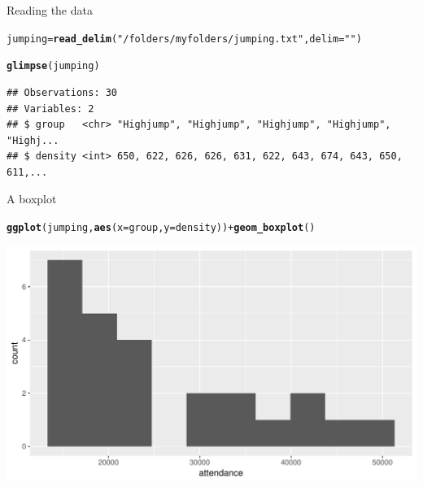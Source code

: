 \documentclass[unknownkeysallowed]{beamer}\usepackage[]{graphicx}\usepackage[]{color}
\makeatletter
\def\maxwidth{ %
  \ifdim\Gin@nat@width>\linewidth
    \linewidth
  \else
    \Gin@nat@width
  \fi
}
\newcommand{\hlstr}[1]{\textcolor[rgb]{0.192,0.494,0.8}{#1}}%
\newcommand{\hlopt}[1]{\textcolor[rgb]{0,0,0}{#1}}%
\newcommand{\hlstd}[1]{\textcolor[rgb]{0.345,0.345,0.345}{#1}}%
\newcommand{\hlkwb}[1]{\textcolor[rgb]{0.69,0.353,0.396}{#1}}%
\newcommand{\hlkwc}[1]{\textcolor[rgb]{0.333,0.667,0.333}{#1}}%
\newcommand{\hlkwd}[1]{\textcolor[rgb]{0.737,0.353,0.396}{\textbf{#1}}}%
\newenvironment{kframe}{%
 \def\at@end@of@kframe{}%
 \ifinner\ifhmode%
  \def\at@end@of@kframe{\end{minipage}}%
  \begin{minipage}{\columnwidth}%
 \fi\fi%
 \def\FrameCommand##1{\hskip\@totalleftmargin \hskip-\fboxsep
 \colorbox{shadecolor}{##1}\hskip-\fboxsep
     \hskip-\linewidth \hskip-\@totalleftmargin \hskip\columnwidth}%
 \MakeFramed {\advance\hsize-\width
   \@totalleftmargin\z@ \linewidth\hsize
   \@setminipage}}%
 {\par\unskip\endMakeFramed%
 \at@end@of@kframe}
\newenvironment{knitrout}{}{} %
\makeatother
\begin{document}
\begin{frame}[fragile]{Reading the data}

\begin{knitrout}\footnotesize
{}\color{fgcolor}\begin{kframe}
\begin{alltt}
\hlstd{jumping}\hlkwb{=}\hlkwd{read_delim}\hlstd{(}\hlstr{"/folders/myfolders/jumping.txt"}\hlstd{,}\hlkwc{delim}\hlstd{=}\hlstr{" "}\hlstd{)}
\end{alltt}


{\ttfamily\noindent\itshape\color{messagecolor}{\#\# Parsed with column specification:\\\#\# cols(\\\#\#\ \  group = col\_character(),\\\#\#\ \  density = col\_integer()\\\#\# )}}\begin{alltt}
\hlkwd{glimpse}\hlstd{(jumping)}
\end{alltt}
\begin{verbatim}
## Observations: 30
## Variables: 2
## $ group   <chr> "Highjump", "Highjump", "Highjump", "Highjump", "Highj...
## $ density <int> 650, 622, 626, 626, 631, 622, 643, 674, 643, 650, 611,...
\end{verbatim}
\end{kframe}
\end{knitrout}
\end{frame}

\begin{frame}[fragile]{A boxplot}
  
\begin{knitrout}
\color{fgcolor}\begin{kframe}
\begin{alltt}
\hlkwd{ggplot}\hlstd{(jumping,}\hlkwd{aes}\hlstd{(}\hlkwc{x}\hlstd{=group,}\hlkwc{y}\hlstd{=density))}\hlopt{+}\hlkwd{geom_boxplot}\hlstd{()}
\end{alltt}
\end{kframe}
\includegraphics[width=\maxwidth]{figure/unnamed-chunk-3-1} 

\end{knitrout}
  
\end{frame}
\end{document}
